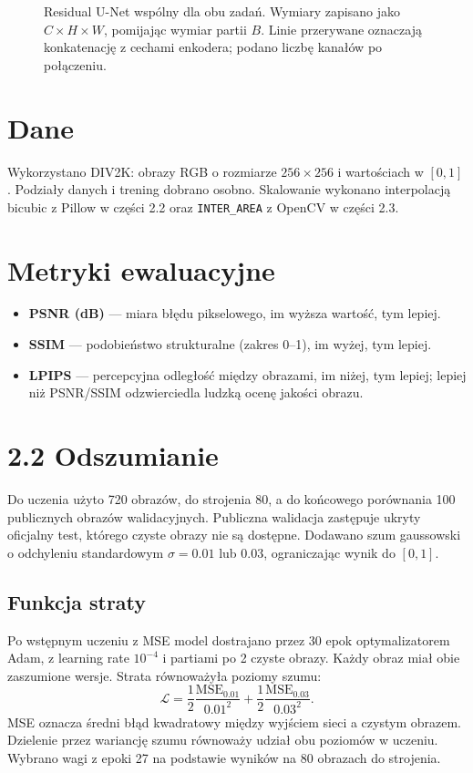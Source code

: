 \documentclass[11pt,a4paper]{article}
\begin{document}
\begin{figure}[H]
\caption{Residual U-Net wspólny dla obu zadań. Wymiary zapisano jako
$C\times H\times W$, pomijając wymiar partii $B$.
Linie przerywane oznaczają konkatenację z cechami enkodera;
podano liczbę kanałów po połączeniu.}
\end{figure}


\section*{Dane}
Wykorzystano DIV2K: obrazy RGB o rozmiarze $256\times256$ i wartościach
w $[0,1]$. Podziały danych i trening dobrano osobno. Skalowanie wykonano
interpolacją bicubic z Pillow w części 2.2 oraz \texttt{INTER\_AREA}
z OpenCV w części 2.3.


\begingroup
\section*{Metryki ewaluacyjne}
\begin{itemize}
\item \textbf{PSNR (dB)} --- miara błędu pikselowego, im wyższa wartość, tym lepiej.
\item \textbf{SSIM} --- podobieństwo strukturalne (zakres 0--1), im wyżej, tym lepiej.
\item \textbf{LPIPS} --- percepcyjna odległość między obrazami, im niżej, tym lepiej; lepiej niż PSNR/SSIM odzwierciedla ludzką ocenę jakości obrazu.
\end{itemize}
\endgroup

\endgroup


\clearpage
\section*{2.2 Odszumianie}
Do uczenia użyto 720 obrazów, do strojenia 80, a do końcowego porównania
100 publicznych obrazów walidacyjnych. Publiczna walidacja zastępuje ukryty
oficjalny test, którego czyste obrazy nie są dostępne. Dodawano szum gaussowski
o odchyleniu standardowym $\sigma=0.01$ lub $0.03$, ograniczając wynik do $[0,1]$.

\subsection*{Funkcja straty}
Po wstępnym uczeniu z MSE model dostrajano przez 30 epok optymalizatorem Adam,
z learning rate $10^{-4}$ i partiami po 2 czyste obrazy. Każdy obraz miał
obie zaszumione wersje. Strata równoważyła poziomy szumu:
\[
\mathcal{L}=\frac{1}{2}\frac{\mathrm{MSE}_{0.01}}{0.01^2}
           +\frac{1}{2}\frac{\mathrm{MSE}_{0.03}}{0.03^2}.
\]
MSE oznacza średni błąd kwadratowy między wyjściem sieci a czystym obrazem.
Dzielenie przez wariancję szumu równoważy udział obu poziomów w uczeniu.
Wybrano wagi z epoki 27 na podstawie wyników na 80 obrazach do strojenia.
\end{document}
